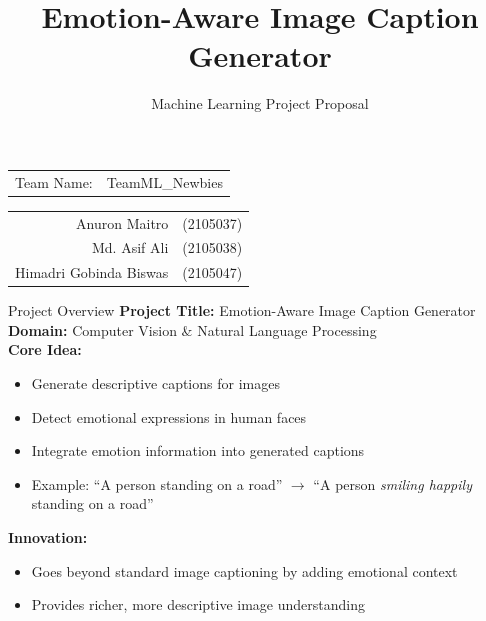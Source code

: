 \documentclass{beamer}
\title{Emotion-Aware Image Caption Generator}
\subtitle{Machine Learning Project Proposal}
\author{}
\date{}
\newcommand{\authorinfo}{
    \begin{tabular}{rl}
    Team Name: & TeamML\_Newbies \\[0.3em]
    \end{tabular}
    
    \vspace{0.3cm}
    
    \begin{tabular}{rl}
    Anuron Maitro & (2105037) \\
    Md. Asif Ali & (2105038) \\
    Himadri Gobinda Biswas & (2105047)
    \end{tabular}
}
\begin{document}
\begin{frame}
    \titlepage
    \vspace{-1cm}
    \begin{center}
        \authorinfo
    \end{center}
\end{frame}

\begin{frame}{Project Overview}
    \textbf{Project Title:} Emotion-Aware Image Caption Generator \\[0.5em]
    \textbf{Domain:} Computer Vision \& Natural Language Processing \\[1em]
    
    \textbf{Core Idea:}
    \begin{itemize}
        \item Generate descriptive captions for images
        \item Detect emotional expressions in human faces
        \item Integrate emotion information into generated captions
        \item Example: ``A person standing on a road'' $\rightarrow$ ``A person \textit{smiling happily} standing on a road''
    \end{itemize}
    
    \vspace{0.3cm}
    \textbf{Innovation:}
    \begin{itemize}
        \item Goes beyond standard image captioning by adding emotional context
        \item Provides richer, more descriptive image understanding
    \end{itemize}
\end{frame}

    
\end{document}
